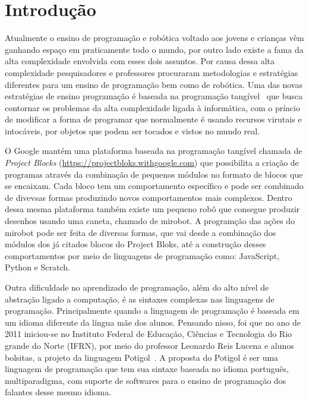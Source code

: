 \chapter{Introdução}
\label{cap:introducao}

Atualmente o ensino de programação e robótica voltado aos jovens e crianças vêm
ganhando espaço em praticamente todo o mundo, por outro lado existe a fama da
alta complexidade envolvida com esses dois assuntos. Por causa dessa alta
complexidade pesquisadores e professores procuraram metodologias e
estratégias diferentes para um ensino de programação bem como de robótica.
Uma das novas estratégias de ensino programação é baseada na
programação tangível~\cite{Horn2007} que busca contornar os problemas da alta complexidade ligada à informática, com o príncio de modificar a forma de programar que
normalmente é usando recursos virutais e intocáveis, por objetos que podem ser
tocados e vistos no mundo real.


O Google mantém uma plataforma baseada na programação tangível chamada de \textit{Project Blocks} (\hyperref[https://projectbloks.withgoogle.com]{https://projectbloks.withgoogle.com}) 
que possibilita a criação de programas através da
combinação de pequenos módulos no formato de blocos que se encaixam. 
Cada bloco tem um comportamento específico e pode ser combinado de divevsas formas
produzindo novos comportamentos mais complexos.
Dentro dessa mesma plataforma também existe um pequeno robô que consegue produzir desenhos usando uma caneta, chamado de mirobot. A programção das ações do mirobot pode ser feita de diversas formas, que vai desde a combinação dos módulos dos já citados blocos do Project Bloks, até a construção
desses comportamentos por meio de linguagens de programação como: JavaScript,
Python e Scratch.

Outra dificuldade no aprendizado de programação, além do alto nível de
abstração ligado a computação, é as sintaxes complexas nas linguagens
de programação. Principalmente quando a linguagem de programação é baseada em um
idioma diferente da língua mãe dos alunos. Pensando nisso, foi que no ano de
2011 iniciou-se no Instituto Federal de Educação, Ciências e Tecnologia do Rio
grande do Norte (IFRN), por meio do professor Leonardo Reis Lucena e alunos
bolsitas, a projeto da linguagem Potigol~\cite{potigol}. A proposta do Potigol é ser uma
linguagem de programação que tem sua sintaxe baseada no idioma português, multiparadigma, com suporte de softwares para o ensino de programação dos falantes desse mesmo idioma.


